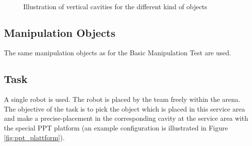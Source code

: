 \begin{figure}
\begin{center}
 \\
\end{center}
\caption{Illustration of vertical cavities for the different kind of objects}
\label{fig:ppt_horizontal_tiles}
\end{figure}

\subsection{Manipulation Objects}
The same manipulation objects as for the Basic Manipulation Test are used. 

\subsection{Task}
A single robot is used. The robot is placed by the team freely within the arena. The objective of the task is to pick the object which is placed in this service area and make a precise-placement in the corresponding cavity at the service area with the special PPT platform (an example configuration is illustrated in Figure \ref{fig:ppt_plattform}). 

